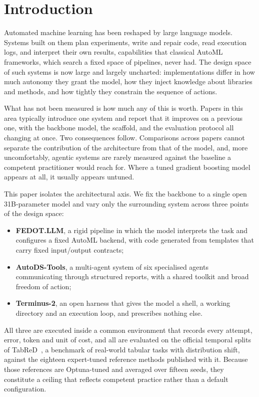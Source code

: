 \section{Introduction}
\label{sec:intro}

Automated machine learning has been reshaped by large language models. Systems
built on them plan experiments, write and repair code, read execution logs, and
interpret their own results, capabilities that classical AutoML frameworks,
which search a fixed space of pipelines, never had. The design space of such
systems is now large and largely uncharted: implementations differ in how much
autonomy they grant the model, how they inject knowledge about libraries and
methods, and how tightly they constrain the sequence of actions.

What has not been measured is how much any of this is worth. Papers in this area
typically introduce one system and report that it improves on a previous one,
with the backbone model, the scaffold, and the evaluation protocol all changing
at once. Two consequences follow. Comparisons across papers cannot separate the
contribution of the architecture from that of the model, and, more
uncomfortably, agentic systems are rarely measured against the baseline a
competent practitioner would reach for. Where a tuned gradient boosting model
appears at all, it usually appears untuned.

This paper isolates the architectural axis. We fix the backbone to a single open
31B-parameter model and vary only the surrounding system across three points of
the design space:

\begin{itemize}
  \item \textbf{FEDOT.LLM}, a rigid pipeline in which the model interprets the
        task and configures a fixed AutoML backend, with code generated from
        templates that carry fixed input/output contracts;
  \item \textbf{AutoDS-Tools}, a multi-agent system of six specialised agents
        communicating through structured reports, with a shared toolkit and
        broad freedom of action;
  \item \textbf{Terminus-2}, an open harness that gives the model a shell, a
        working directory and an execution loop, and prescribes nothing else.
\end{itemize}

All three are executed inside a common environment that records every attempt,
error, token and unit of cost, and all are evaluated on the official temporal
splits of TabReD~\citep{rubachev2024tabred}, a benchmark of real-world tabular
tasks with distribution shift, against the eighteen expert-tuned reference
methods published with it. Because those references are Optuna-tuned and
averaged over fifteen seeds, they constitute a ceiling that reflects competent
practice rather than a default configuration.

